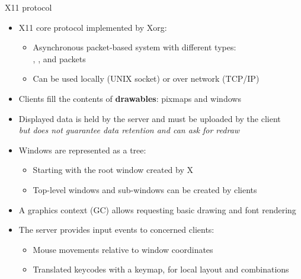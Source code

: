 \begin{frame}{X11 protocol}
  \begin{itemize}
  \item X11 core protocol implemented by Xorg:
    \begin{itemize}
    \item Asynchronous packet-based system with different types:\\
    , ,  and  packets
    \item Can be used locally (UNIX socket) or over network (TCP/IP)
    \end{itemize}
  \item Clients fill the contents of \textbf{drawables}: pixmaps and windows
  \item Displayed data is held by the server and must be uploaded by the client\\
    \textit{but does not guarantee data retention and can ask for redraw}
  \item Windows are represented as a tree:
    \begin{itemize}
    \item Starting with the root window created by X
    \item Top-level windows and sub-windows can be created by clients
    \end{itemize}
  \item A graphics context (GC) allows requesting basic drawing and font rendering
  \item The server provides input events to concerned clients:
    \begin{itemize}
    \item Mouse movements relative to window coordinates
    \item Translated keycodes with a keymap, for local layout and combinations
    \end{itemize}
  \end{itemize}
\end{frame}

